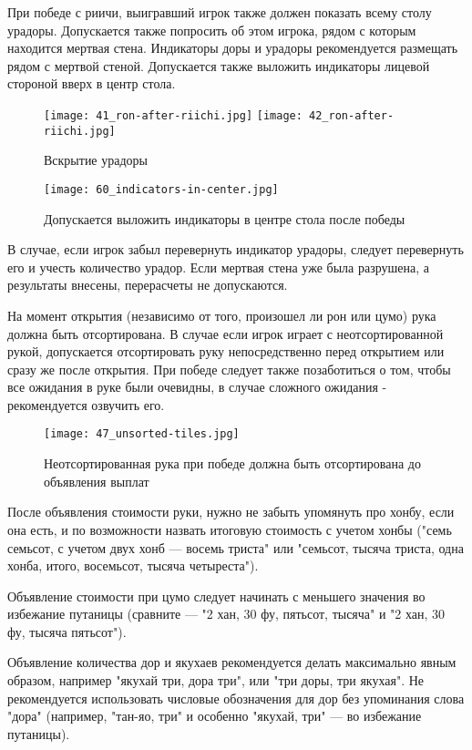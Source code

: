 При победе с риичи, выигравший игрок также должен показать всему столу урадоры. Допускается также попросить об этом игрока, рядом с которым находится мертвая стена. Индикаторы доры и урадоры рекомендуется размещать рядом с мертвой стеной. Допускается также выложить индикаторы лицевой стороной вверх в центр стола.

\begin{figure}[H]
	\centering
	\texttt{[image: 41\_ron-after-riichi.jpg]}
	\texttt{[image: 42\_ron-after-riichi.jpg]}
	\caption{Вскрытие урадоры}
\end{figure}

\begin{figure}[H]
	\centering
	\texttt{[image: 60\_indicators-in-center.jpg]}
	\caption{Допускается выложить индикаторы в центре стола после победы}
\end{figure}

В случае, если игрок забыл перевернуть индикатор урадоры, следует перевернуть его и учесть количество урадор. Если мертвая стена уже была разрушена, а результаты внесены, перерасчеты не допускаются.

На момент открытия (независимо от того, произошел ли рон или цумо) рука должна быть отсортирована. В случае если игрок играет с неотсортированной рукой, допускается отсортировать руку непосредственно перед открытием или сразу же после открытия. При победе следует также позаботиться о том, чтобы все ожидания в руке были очевидны, в случае сложного ожидания - рекомендуется озвучить его.

\begin{figure}[H]
	\centering
	\texttt{[image: 47\_unsorted-tiles.jpg]}
	\caption{Неотсортированная рука при победе должна быть отсортирована до объявления выплат}
\end{figure}

После объявления стоимости руки, нужно не забыть упомянуть про хонбу, если она есть, и по возможности назвать итоговую стоимость с учетом хонбы ("семь семьсот, с учетом двух хонб --- восемь триста" или "семьсот, тысяча триста, одна хонба, итого, восемьсот, тысяча четыреста").

Объявление стоимости при цумо следует начинать с меньшего значения во избежание путаницы (сравните --- "2 хан, 30 фу, пятьсот, тысяча" и "2 хан, 30 фу, тысяча пятьсот").

Объявление количества дор и якухаев рекомендуется делать максимально явным образом, например "якухай три, дора три", или "три доры, три якухая". Не рекомендуется использовать числовые обозначения для дор без упоминания слова "дора" (например, "тан-яо, три" и особенно "якухай, три" --- во избежание путаницы).

